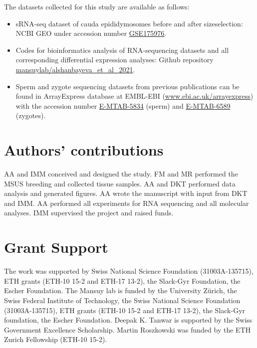 \documentclass[12pt,twoside]{reedthesis}
\begin{document}
The datasets collected for this study are available as follows:
\begin{itemize}
\item
  sRNA-seq dataset of cauda epididymosomes before and after sizeselection: NCBI GEO under accession number \href{https://www.ncbi.nlm.nih.gov/geo/query/acc.cgi?acc=GSE175976}{GSE175976}.
\item
  Codes for bioinformatics analysis of RNA-sequencing datasets and
  all corresponding differential expression analyses: Github repository \href{https://github.com/mansuylab/alshanbayeva_et_al_2021}{mansuylab/alshanbayeva\_et\_al\_2021}.
\item
  Sperm and zygote sequencing datasets from previous publications
  can be found in ArrayExpress database at EMBL-EBI (\url{www.ebi.ac.uk/arrayexpress}) with the accession number \href{https://www.ebi.ac.uk/arrayexpress/experiments/E-MTAB-5834/}{E-MTAB-5834} (sperm) and \href{https://www.ebi.ac.uk/arrayexpress/experiments/E-MTAB-6589/}{E-MTAB-6589} (zygotes).
\end{itemize}
\newpage

\hypertarget{authors-contributions}{%
\section{Authors' contributions}\label{authors-contributions}}

AA and IMM conceived and designed the study. FM and MR performed the MSUS breeding and collected tissue samples. AA and DKT performed data analysis and generated figures. AA wrote the manuscript with input from DKT and IMM. AA performed all
experiments for RNA sequencing and all molecular analyses. IMM supervised the project and raised funds.

\hypertarget{grant-support}{%
\section{Grant Support}\label{grant-support}}

The work was supported by Swiss National Science Foundation (31003A-135715), ETH grants (ETH-10 15-2 and ETH-17 13-2), the Slack-Gyr Foundation, the Escher Foundation. The Mansuy lab is funded by the University Zürich, the Swiss Federal Institute of Technology, the Swiss National Science Foundation (31003A-135715), ETH grants (ETH-10 15-2 and ETH-17 13-2), the Slack-Gyr foundation, the Escher Foundation. Deepak K. Tanwar is supported by the Swiss Government Excellence Scholarship. Martin Roszkowski was funded by the ETH Zurich Fellowship (ETH-10 15-2).
\end{document}

